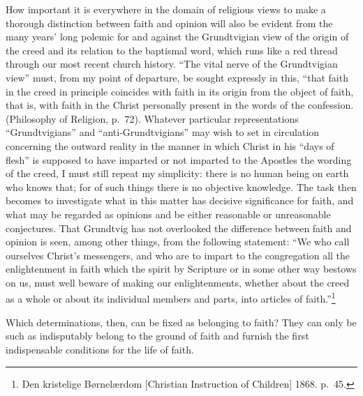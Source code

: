 \documentclass[12pt,a4paper,openany]{book}
\newcommand{\opage}[1]{\marginnote{\footnotesize\textit{[#1]}}}
\begin{document}
How important it is everywhere in the domain of religious views
to make a thorough distinction between faith and
opinion will also be evident from the many years' long
polemic for and against the Grundtvigian view of the
origin of the creed and its relation to the baptismal word,
which runs like a red thread through our most recent
church history. ``The vital nerve of the Grundtvigian view''
must, from my point of departure, be sought expressly in this, ``that
faith in the creed in principle coincides
with faith in its origin from the object of faith,
that is, with faith in the Christ personally
present in the words of the confession. (Philosophy of Religion, p.\ 72). Whatever particular
representations ``Grundtvigians'' and ``anti-Grundtvigians''
may wish to set in circulation concerning the outward
reality in the manner in which Christ in
\setcounter{footnote}{0}%
\opage{32}his ``days of flesh'' is supposed to have imparted or not imparted to
the Apostles the wording of the creed, I must still
repeat my simplicity: there is no human being on
earth who knows that; for of such things there is no objective
knowledge. The task then becomes to investigate what
in this matter has decisive significance for faith, and
what may be regarded as opinions and be either
reasonable or unreasonable conjectures. That Grundtvig has not
overlooked the difference between faith and opinion is seen,
among other things, from the following statement: ``We who call ourselves
Christ's messengers, and who are to impart to the congregation all
the enlightenment in faith which the spirit by Scripture or
in some other way bestows on us, must well beware of
making our enlightenments, whether about the creed as a
whole or about its individual members and parts, into articles of faith.''\footnote[1]{Den kristelige Børnelærdom [Christian Instruction of Children] 1868. p.\ 45.}

Which determinations, then, can be fixed as belonging
to faith? They can only be such as
indisputably belong to the ground of faith and furnish the first
indispensable conditions for the life of faith.
\end{document}
